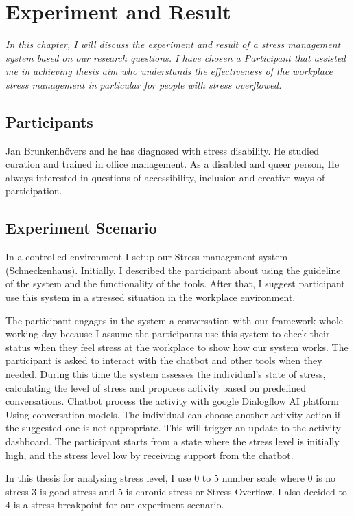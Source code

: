 \chapter{Experiment and Result}
\textit{In this chapter, I will discuss the experiment and result of a stress management system based on our research questions. I have chosen a Participant that assisted me in achieving thesis aim who understands the effectiveness of the workplace stress management in  particular for people with stress overflowed. }
\vspace{5mm}

\section{Participants}
Jan Brunkenhövers and he has diagnosed with stress disability. He studied curation and trained in office management. As a disabled and queer person, He always interested in questions of accessibility, inclusion and creative ways of participation.

\section{Experiment Scenario}
In a controlled environment I setup our Stress management system (Schneckenhaus). Initially, I described the participant about using the guideline of the system and the functionality of the tools. After that, I suggest participant use this system in a stressed situation in the workplace environment. 

The participant engages in the system a conversation with our framework whole working day because I assume the participants use this system to check their status when they feel stress at the workplace to show how our system works. The participant is asked to interact with the chatbot and other tools when they needed. During this time the system assesses the individual's state of stress, calculating the level of stress and proposes activity based on predefined conversations. Chatbot process the activity with google Dialogflow \acs{AI} platform Using conversation models. The individual can choose another activity action if the suggested one is not appropriate. This will trigger an update to the activity dashboard. The participant starts from a state where the stress level is initially high, and the stress level low by receiving support from the chatbot.

In this thesis for analysing stress level, I use 0 to 5 number scale where 0 is no stress 3 is good stress and 5 is chronic stress or Stress Overflow. I also decided to 4 is a stress breakpoint for our experiment scenario.
